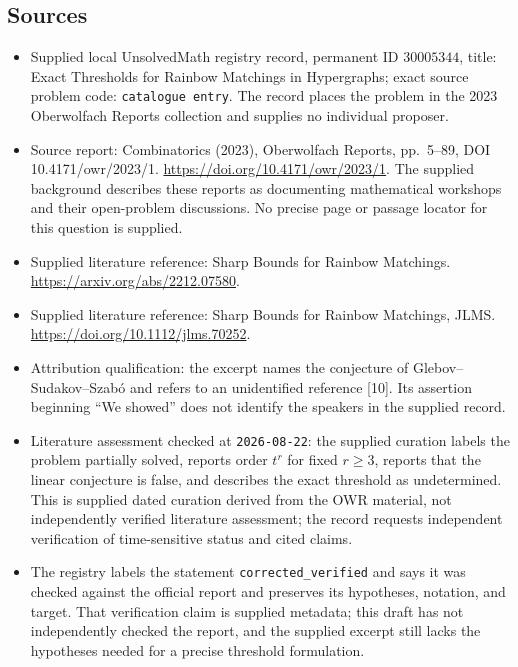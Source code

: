 \documentclass[11pt]{article}
\begin{document}
\subsection{Sources}
\begin{itemize}
\item Supplied local UnsolvedMath registry record, permanent ID \(30005344\), title: Exact Thresholds for Rainbow Matchings in Hypergraphs; exact source problem code: \texttt{catalogue entry}. The record places the problem in the 2023 Oberwolfach Reports collection and supplies no individual proposer.
\item Source report: Combinatorics (2023), Oberwolfach Reports, pp.~5--89, DOI 10.4171/owr/2023/1. \url{https://doi.org/10.4171/owr/2023/1}. The supplied background describes these reports as documenting mathematical workshops and their open-problem discussions. No precise page or passage locator for this question is supplied.
\item Supplied literature reference: Sharp Bounds for Rainbow Matchings. \url{https://arxiv.org/abs/2212.07580}.
\item Supplied literature reference: Sharp Bounds for Rainbow Matchings, JLMS. \url{https://doi.org/10.1112/jlms.70252}.
\item Attribution qualification: the excerpt names the conjecture of Glebov--Sudakov--Szab\'o and refers to an unidentified reference [10]. Its assertion beginning ``We showed'' does not identify the speakers in the supplied record.
\item Literature assessment checked at \texttt{2026-08-22}: the supplied curation labels the problem partially solved, reports order \(t^r\) for fixed \(r\ge 3\), reports that the linear conjecture is false, and describes the exact threshold as undetermined. This is supplied dated curation derived from the OWR material, not independently verified literature assessment; the record requests independent verification of time-sensitive status and cited claims.
\item The registry labels the statement \texttt{corrected\_verified} and says it was checked against the official report and preserves its hypotheses, notation, and target. That verification claim is supplied metadata; this draft has not independently checked the report, and the supplied excerpt still lacks the hypotheses needed for a precise threshold formulation.
\end{itemize}
\end{document}
